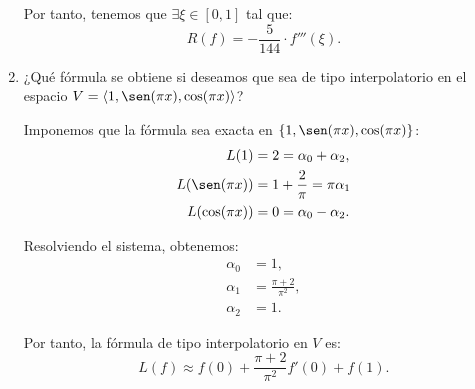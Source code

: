 \begin{ejercicio}
\begin{enumerate}
        Por tanto, tenemos que $\exists \xi\in [0, 1]$ tal que:
        \begin{equation*}
            R(f) = -\dfrac{5}{144}\cdot f'''(\xi).
        \end{equation*}
        \item ¿Qué fórmula se obtiene si deseamos que sea de tipo interpolatorio en el espacio $V = \langle 1, \sen(\pi x), \cos(\pi x)\rangle$?
        
        Imponemos que la fórmula sea exacta en $\{1, \sen(\pi x), \cos(\pi x)\}$:
        \begin{align*}
            L(1) &= 2 = \alpha_0 + \alpha_2,\\
            L(\sen(\pi x)) &= 1 + \frac{2}{\pi} = \pi\alpha_1\\
            L(\cos(\pi x)) &= 0 = \alpha_0 - \alpha_2.
        \end{align*}

        Resolviendo el sistema, obtenemos:
        \begin{align*}
            \alpha_0 &= 1,\\
            \alpha_1 &= \frac{\pi + 2}{\pi^{2}},\\
            \alpha_2 &= 1.
        \end{align*}

        Por tanto, la fórmula de tipo interpolatorio en $V$ es:
        \begin{equation*}
            L(f) \approx f(0) + \frac{\pi + 2}{\pi^{2}} f'\left(0\right) + f(1).
        \end{equation*}
    \end{enumerate}
\end{ejercicio}

